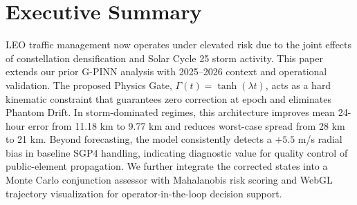 \section*{Executive Summary}
LEO traffic management now operates under elevated risk due to the joint effects of constellation densification and Solar Cycle 25 storm activity. This paper extends our prior G-PINN analysis with 2025--2026 context and operational validation. The proposed Physics Gate, $\Gamma(t)=\tanh(\lambda t)$, acts as a hard kinematic constraint that guarantees zero correction at epoch and eliminates Phantom Drift. In storm-dominated regimes, this architecture improves mean 24-hour error from 11.18 km to 9.77 km and reduces worst-case spread from 28 km to 21 km. Beyond forecasting, the model consistently detects a $+5.5$ m/s radial bias in baseline SGP4 handling, indicating diagnostic value for quality control of public-element propagation. We further integrate the corrected states into a Monte Carlo conjunction assessor with Mahalanobis risk scoring and WebGL trajectory visualization for operator-in-the-loop decision support.